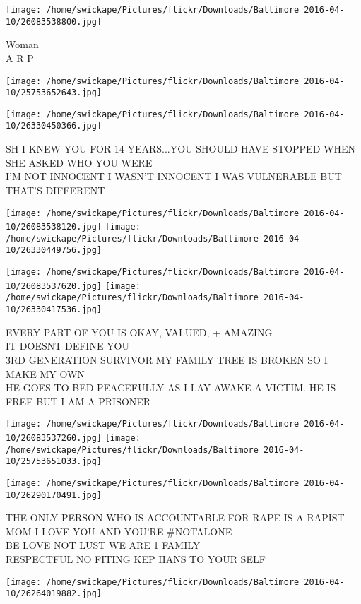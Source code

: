 \documentclass[10pt,letterpaper]{article}
\begin{document}
\vspace{0.25in}
\texttt{[image: /home/swickape/Pictures/flickr/Downloads/Baltimore 2016-04-10/26083538800.jpg]}

Woman\\
A R P
\pagebreak

\texttt{[image: /home/swickape/Pictures/flickr/Downloads/Baltimore 2016-04-10/25753652643.jpg]}

\vspace{0.25in}
\texttt{[image: /home/swickape/Pictures/flickr/Downloads/Baltimore 2016-04-10/26330450366.jpg]}

SH I KNEW YOU FOR 14 YEARS...YOU SHOULD HAVE STOPPED WHEN SHE ASKED WHO YOU WERE\\
I'M NOT INNOCENT I WASN'T INNOCENT I WAS VULNERABLE BUT THAT'S DIFFERENT
\pagebreak

\texttt{[image: /home/swickape/Pictures/flickr/Downloads/Baltimore 2016-04-10/26083538120.jpg]}
\texttt{[image: /home/swickape/Pictures/flickr/Downloads/Baltimore 2016-04-10/26330449756.jpg]}

\texttt{[image: /home/swickape/Pictures/flickr/Downloads/Baltimore 2016-04-10/26083537620.jpg]}
\texttt{[image: /home/swickape/Pictures/flickr/Downloads/Baltimore 2016-04-10/26330417536.jpg]}

EVERY PART OF YOU IS OKAY, VALUED, + AMAZING\\
IT DOESNT DEFINE YOU\\
3RD GENERATION SURVIVOR MY FAMILY TREE IS BROKEN SO I MAKE MY OWN\\
HE GOES TO BED PEACEFULLY AS I LAY AWAKE A VICTIM.  HE IS FREE BUT I AM A PRISONER
\pagebreak

\texttt{[image: /home/swickape/Pictures/flickr/Downloads/Baltimore 2016-04-10/26083537260.jpg]}
\texttt{[image: /home/swickape/Pictures/flickr/Downloads/Baltimore 2016-04-10/25753651033.jpg]}

\texttt{[image: /home/swickape/Pictures/flickr/Downloads/Baltimore 2016-04-10/26290170491.jpg]}

THE ONLY PERSON WHO IS ACCOUNTABLE FOR RAPE IS A RAPIST MOM I LOVE YOU AND YOU'RE \#NOTALONE\\
BE LOVE NOT LUST WE ARE 1 FAMILY\\
RESPECTFUL NO FITING KEP HANS TO YOUR SELF
\pagebreak

\texttt{[image: /home/swickape/Pictures/flickr/Downloads/Baltimore 2016-04-10/26264019882.jpg]}
\end{document}
